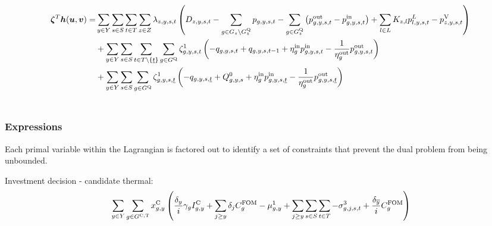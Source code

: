 \documentclass{article}
\begin{document}
\begin{align}
	\bm{\zeta}^{T} \bm{h}(\bm{u}, \bm{v}) = 	& \sum\limits_{\iYear \in \sYears}\sum\limits_{\iScenario \in \sScenarios}\sum\limits_{\iInterval \in \sIntervals} \sum\limits_{\iZone \in \sZones} \dPowerBalance \left(\cDemand - \sum\limits_{\iGenerator \in \sGenerators_{\iZone} \setminus \sStorage_{\iZone}} \vPower - \sum\limits_{\iGenerator \in \sStorage_{\iZone}} \left(\vPowerOut - \vPowerIn\right) + \sum\limits_{\iLink \in \sLinks} \cIncidenceMatrix \vPowerFlow - \vLostLoadPower \right) \nonumber\\
	& + \sum\limits_{\iYear \in \sYears}\sum\limits_{\iScenario \in \sScenarios}\sum\limits_{\iInterval \in \sIntervals \setminus \{\iIntervalStart\}} \sum\limits_{\iGenerator \in \sStorage} \dStorageEnergyTransition \left(-\vStorageUnitEnergy + \vStorageUnitEnergy[\iGenerator,\iYear,\iScenario,\iInterval-1] + \cStorageUnitEfficiencyCharging \vPowerIn - \frac{1}{\cStorageUnitEfficiencyDischarging} \vPowerOut \right) \nonumber\\
	& + \sum\limits_{\iYear \in \sYears} \sum\limits_{\iScenario \in \sScenarios} \sum\limits_{\iGenerator \in \sStorage} \dStorageEnergyTransition[\iGenerator,\iYear,\iScenario,\iIntervalStart] \left(-\vStorageUnitEnergy[\iGenerator,\iYear,\iScenario,\iIntervalStart] + \cStorageEnergyInitial + \cStorageUnitEfficiencyCharging \vPowerIn[\iGenerator,\iYear,\iScenario,\iIntervalStart] - \frac{1}{\cStorageUnitEfficiencyDischarging} \vPowerOut[\iGenerator,\iYear,\iScenario,\iIntervalStart] \right)\\\nonumber
\end{align}



\subsubsection{Expressions}
Each primal variable within the Lagrangian is factored out to identify a set of constraints that prevent the dual problem from being unbounded.

\newcommand{\sumIntervals}{\sum\limits_{\iYear \in \sYears}\sum\limits_{\iScenario \in \sScenarios} \sum\limits_{\iInterval \in \sIntervals}}

Investment decision - candidate thermal:
\begin{align}
	& \sum\limits_{\iYear \in \sYears} \sum\limits_{\iGenerator \in \sGeneratorsCandidateThermal} \vInstalledCapacity \left(\frac{\cDiscountRate}{\cInterestRate} \cAmortisationRate \cCandidateInvestmentCost + \sum\limits_{\iYearAlias \geq \iYear} \cDiscountRate[\iYearAlias] \cFixedOperationsMaintenanceCostGenerator - \dNonNegativeCandidateCapacity + \sum\limits_{\iYearAlias \geq \iYear} \sum\limits_{\iScenario \in \sScenarios} \sum\limits_{\iInterval \in \sIntervals} - \dMaxPowerOutputCandidateThermal[\iGenerator,\iYearAlias,\iScenario,\iInterval] + \frac{\cDiscountRate[\iYearTerminal]}{\cInterestRate}\cFixedOperationsMaintenanceCostGenerator\right)\\\nonumber
\end{align}
\end{document}
